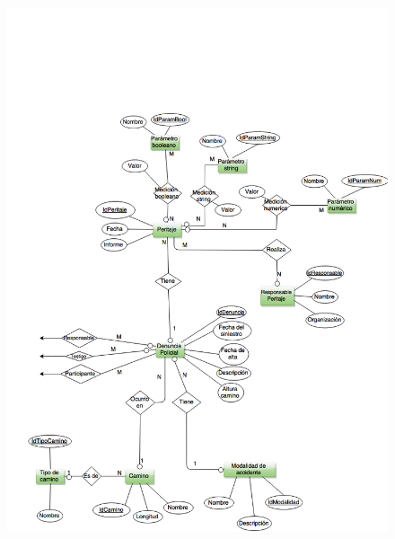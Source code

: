 \begin{figure}[h!]
  \centering
  \includegraphics[width=1\textwidth]{./images/DER_2.png}
\end{figure}